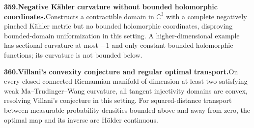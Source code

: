 \documentclass[11pt,a4paper]{article}
\begin{document}
  \par \begin{minipage}{\linewidth}
  \fontsize{10.5}{12.6}\selectfont\RaggedRight
  \hypertarget{result 359}{}
  {\bfseries\textcolor{muted}{359.}\enspace Negative K\"ahler curvature without bounded holomorphic coordinates.}\enspace Constructs a contractible domain in $\mathbb C^3$ with a complete negatively pinched K\"ahler metric but no bounded holomorphic coordinates, disproving bounded-domain uniformization in this setting. A higher-dimensional example has sectional curvature at most $-1$ and only constant bounded holomorphic functions; its curvature is not bounded below.\par
  \end{minipage}\par\vspace{5pt}



  \par \begin{minipage}{\linewidth}
  \fontsize{10.5}{12.6}\selectfont\RaggedRight
  \hypertarget{result 360}{}
  {\bfseries\textcolor{muted}{360.}\enspace Villani’s convexity conjecture and regular optimal transport.}\enspace On every closed connected Riemannian manifold of dimension at least two satisfying weak Ma--Trudinger--Wang curvature, all tangent injectivity domains are convex, resolving Villani’s conjecture in this setting. For squared-distance transport between measurable probability densities bounded above and away from zero, the optimal map and its inverse are H\"older continuous.\par
  \end{minipage}\par\vspace{5pt}
\end{document}
